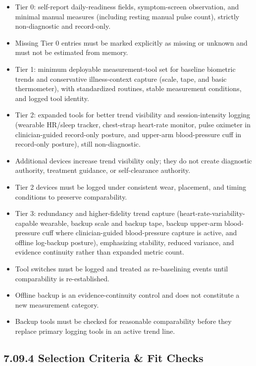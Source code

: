 \documentclass[10pt]{article}
\begin{document}
\begin{itemize}
\item Tier 0: self-report daily-readiness fields, symptom-screen observation, and minimal manual measures (including resting manual pulse count), strictly non-diagnostic and record-only.
\item Missing Tier 0 entries must be marked explicitly as missing or unknown and must not be estimated from memory.
\item Tier 1: minimum deployable measurement-tool set for baseline biometric trends and conservative illness-context capture (scale, tape, and basic thermometer), with standardized routines, stable measurement conditions, and logged tool identity.
\item Tier 2: expanded tools for better trend visibility and session-intensity logging (wearable HR/sleep tracker, chest-strap heart-rate monitor, pulse oximeter in clinician-guided record-only posture, and upper-arm blood-pressure cuff in record-only posture), still non-diagnostic.
\item Additional devices increase trend visibility only; they do not create diagnostic authority, treatment guidance, or self-clearance authority.
\item Tier 2 devices must be logged under consistent wear, placement, and timing conditions to preserve comparability.
\item Tier 3: redundancy and higher-fidelity trend capture (heart-rate-variability-capable wearable, backup scale and backup tape, backup upper-arm blood-pressure cuff where clinician-guided blood-pressure capture is active, and offline log-backup posture), emphasizing stability, reduced variance, and evidence continuity rather than expanded metric count.
\item Tool switches must be logged and treated as re-baselining events until comparability is re-established.
\item Offline backup is an evidence-continuity control and does not constitute a new measurement category.
\item Backup tools must be checked for reasonable comparability before they replace primary logging tools in an active trend line.
\end{itemize}

\subsection*{7.09.4 Selection Criteria \& Fit Checks}
{}
\end{document}
